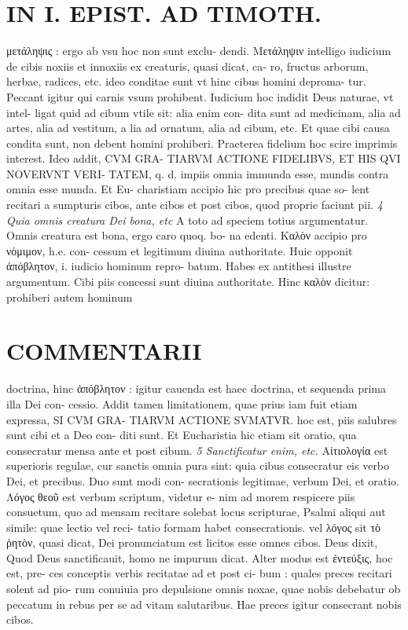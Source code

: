 \documentclass{article}
\begin{document}
\begin{pages}
\section*{IN I. EPIST. AD TIMOTH. }
\marginpar{[ p.91 ]}\pstart μετάληψις : ergo ab vsu hoc non sunt exclu- dendi. Μετάληψιν intelligo iudicium de cibis noxiis et innoxiis ex creaturis, quasi dicat, ca- ro, fructus arborum, herbae, radices, etc. ideo conditae sunt vt hinc cibus homini deproma- tur. Peccant igitur qui carnis vsum prohibent. Iudicium hoc indidit Deus naturae, vt intel- ligat quid ad cibum vtile sit: alia enim con- dita sunt ad medicinam, alia ad artes, alia ad vestitum, a lia ad ornatum, alia ad cibum, etc. Et quae cibi causa condita sunt, non debent homini prohiberi. Praeterea fidelium hoc scire imprimis interest. Ideo addit, CVM GRA- TIARVM ACTIONE FIDELIBVS, ET HIS QVI NOVERVNT VERI- TATEM, q. d. impiis omnia immunda esse, mundis contra omnia esse munda. Et Eu- charistiam accipio hic pro precibus quae so- lent recitari a sumpturis cibos, ante cibos et post cibos, quod proprie faciunt pii.  \pend
\textit{4 Quia omnis creatura Dei bona, etc }\pstart A toto ad speciem totius argumentatur. Omnis creatura est bona, ergo caro quoq. bo- na edenti. Καλὸν accipio pro νόμιμον, h.e. con- cessum et legitimum diuina authoritate. Huic opponit ἀπόβλητον, i. iudicio hominum repro- batum. Habes ex antithesi illustre argumentum. Cibi piis concessi sunt diuina authoritate. Hinc καλὸν dicitur: prohiberi autem hominum  \pend
\section*{COMMENTARII }
\marginpar{[ p.92 ]}\pstart doctrina, hinc ἀπόβλητον : igitur cauenda est haec doctrina, et sequenda prima illa Dei con- cessio. Addit tamen limitationem, quae prius iam fuit etiam expressa, SI CVM GRA- TIARVM ACTIONE SVMATVR. hoc est, piis salubres sunt cibi et a Deo con- diti sunt. Et Eucharistia hic etiam sit oratio, qua consecratur mensa ante et post cibum.  \pend
\textit{5 Sanctificatur enim, etc. }\pstart Αἰτιολογία est superioris regulae, cur sanctis omnia pura sint: quia cibus consecratur eis verbo Dei, et precibus. Duo sunt modi con- secrationis legitimae, verbum Dei, et oratio. Λόγος θεοῦ est verbum scriptum, videtur e- nim ad morem respicere piis consuetum, quo ad mensam recitare solebat locus scripturae, Psalmi aliqui aut simile: quae lectio vel reci- tatio formam habet consecrationis. vel λόγος sit τὸ ῤητὸν, quasi dicat, Dei pronunciatum est licitos esse omnes cibos. Deus dixit, Quod Deus sanctificauit, homo ne impurum dicat. Alter modus est ἐντεύξις, hoc est, pre- ces conceptis verbis recitatae ad et post ci- bum : quales preces recitari solent ad pio- rum conuiuia pro depulsione omnis noxae, quae nobis debebatur ob peccatum in rebus per se ad vitam salutaribus. Hae preces igitur consecrant nobis cibos.  \pend

\end{pages}
\end{document}
